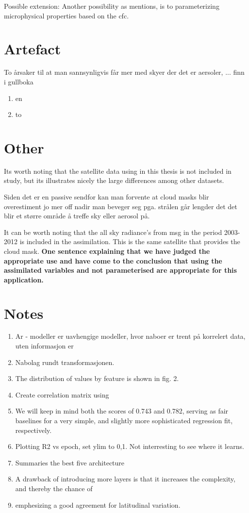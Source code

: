Possible extension: Another possibility as \cite{Fowler1996LiquidAssumptions} mentions, is to parameterizing microphysical properties based on the \acrshort{cfc}.

\section{Artefact}
To årsaker til at man sannsynligvis får mer med skyer der det er aersoler,  ... finn i gullboka
\begin{enumerate}
    \item en
    \item to
\end{enumerate}


\section{Other}
Its worth noting that the satellite data using in this thesis is not included in  \citeauthor{Stubenrauch2013AssessmentPanel} study, but its illustrates nicely the large differences among other datasets. 


Siden det er en passive sendfor kan man forvente at cloud masks blir overestiment jo mer off nadir man beveger seg pga. strålen går lengder det det blir et større område å treffe sky eller aerosol på. \citeauthor{Maddux2010ViewingProducts}


It can be worth noting that the all sky radiance's from \acrfull{msg} in the period 2003-2012 is included in the assimilation. This is the same satellite that provides the cloud mask. 
\textbf{One sentence explaining that we have judged the appropriate use and have come to the conclusion that using the assimilated variables and not parameterised are appropriate for this application.}

\section{Notes}
\begin{enumerate}
    \item Ar - modeller er uavhengige modeller, hvor naboer er trent på korrelert data, uten informasjon er
    \item Nabolag rundt transformasjonen. 
    \item The distribution of values
    by feature is shown in fig. 2.
    \item Create correlation matrix using 
    \item We will keep in mind both the scores of 0.743 and 0.782, serving
    as fair baselines for a very simple, and slightly more sophisticated
    regression fit, respectively.
    \item Plotting R2 vs epoch, set ylim to 0,1. Not interresting to see where it learns.
    \item Summaries the best five architecture 
    \item A drawback of introducing more layers
    is that it increases the complexity, and thereby the chance of
    \item emphesizing a good agreement for latitudinal variation.
\end{enumerate}

